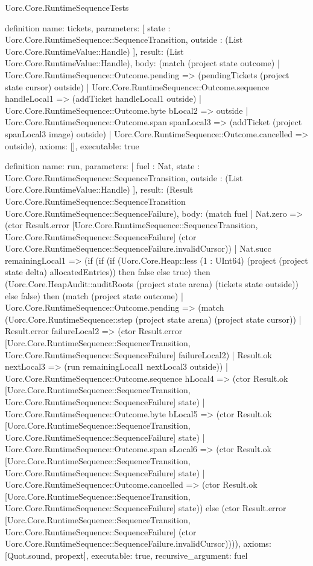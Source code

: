 \begin{lexlean}{Uorc.Core.RuntimeSequenceTests}
\begin{semanticmodule}
definition{
  name: tickets,
  parameters: [
    state : Uorc.Core.RuntimeSequence::SequenceTransition,
    outside : (List Uorc.Core.RuntimeValue::Handle)
  ],
  result: (List Uorc.Core.RuntimeValue::Handle),
  body: (match (project state outcome)
    | Uorc.Core.RuntimeSequence::Outcome.pending => (pendingTickets (project state cursor) outside)
    | Uorc.Core.RuntimeSequence::Outcome.sequence handleLocal1 => (addTicket handleLocal1 outside)
    | Uorc.Core.RuntimeSequence::Outcome.byte bLocal2 => outside
    | Uorc.Core.RuntimeSequence::Outcome.span spanLocal3 => (addTicket (project spanLocal3 image) outside)
    | Uorc.Core.RuntimeSequence::Outcome.cancelled => outside),
  axioms: [],
  executable: true
}

definition{
  name: run,
  parameters: [
    fuel : Nat,
    state : Uorc.Core.RuntimeSequence::SequenceTransition,
    outside : (List Uorc.Core.RuntimeValue::Handle)
  ],
  result: (Result Uorc.Core.RuntimeSequence::SequenceTransition Uorc.Core.RuntimeSequence::SequenceFailure),
  body: (match fuel
    | Nat.zero => (ctor Result.error [Uorc.Core.RuntimeSequence::SequenceTransition, Uorc.Core.RuntimeSequence::SequenceFailure] (ctor Uorc.Core.RuntimeSequence::SequenceFailure.invalidCursor))
    | Nat.succ remainingLocal1 => (if (if (if (Uorc.Core.Heap::less (1 : UInt64) (project (project state delta) allocatedEntries)) then false else true) then (Uorc.Core.HeapAudit::auditRoots (project state arena) (tickets state outside)) else false) then (match (project state outcome)
      | Uorc.Core.RuntimeSequence::Outcome.pending => (match (Uorc.Core.RuntimeSequence::step (project state arena) (project state cursor))
        | Result.error failureLocal2 => (ctor Result.error [Uorc.Core.RuntimeSequence::SequenceTransition, Uorc.Core.RuntimeSequence::SequenceFailure] failureLocal2)
        | Result.ok nextLocal3 => (run remainingLocal1 nextLocal3 outside))
      | Uorc.Core.RuntimeSequence::Outcome.sequence hLocal4 => (ctor Result.ok [Uorc.Core.RuntimeSequence::SequenceTransition, Uorc.Core.RuntimeSequence::SequenceFailure] state)
      | Uorc.Core.RuntimeSequence::Outcome.byte bLocal5 => (ctor Result.ok [Uorc.Core.RuntimeSequence::SequenceTransition, Uorc.Core.RuntimeSequence::SequenceFailure] state)
      | Uorc.Core.RuntimeSequence::Outcome.span sLocal6 => (ctor Result.ok [Uorc.Core.RuntimeSequence::SequenceTransition, Uorc.Core.RuntimeSequence::SequenceFailure] state)
      | Uorc.Core.RuntimeSequence::Outcome.cancelled => (ctor Result.ok [Uorc.Core.RuntimeSequence::SequenceTransition, Uorc.Core.RuntimeSequence::SequenceFailure] state)) else (ctor Result.error [Uorc.Core.RuntimeSequence::SequenceTransition, Uorc.Core.RuntimeSequence::SequenceFailure] (ctor Uorc.Core.RuntimeSequence::SequenceFailure.invalidCursor)))),
  axioms: [Quot.sound, propext],
  executable: true,
  recursive_argument: fuel
}


\end{semanticmodule}
\end{lexlean}
